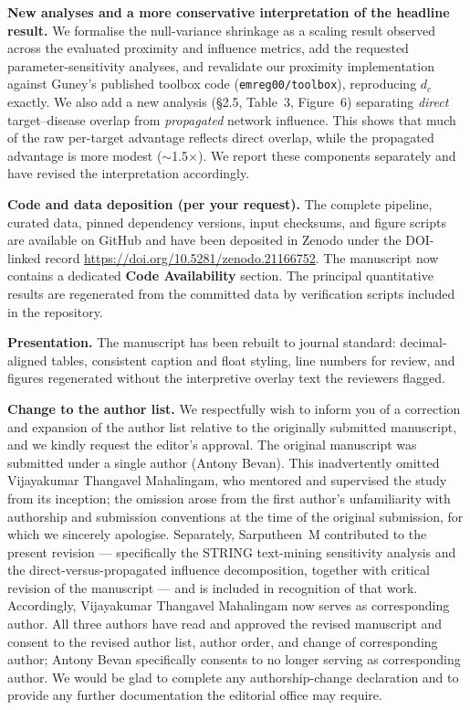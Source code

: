 \documentclass[11pt]{article}
\begin{document}
\bigskip
\noindent \textbf{New analyses and a more conservative interpretation of the headline result.}
We formalise the null-variance shrinkage as a scaling result observed across the evaluated proximity and influence metrics, add the requested parameter-sensitivity analyses, and revalidate our proximity implementation against Guney's published toolbox code (\texttt{emreg00/\allowbreak toolbox}), reproducing $d_c$ exactly. We also add a new analysis (\S2.5, Table~3, Figure~6) separating \emph{direct} target--disease overlap from \emph{propagated} network influence. This shows that much of the raw per-target advantage reflects direct overlap, while the propagated advantage is more modest ($\sim$1.5$\times$). We report these components separately and have revised the interpretation accordingly.

\bigskip
\noindent \textbf{Code and data deposition (per your request).}
The complete pipeline, curated data, pinned dependency versions, input checksums, and figure scripts are available on GitHub and have been deposited in Zenodo under the DOI-linked record \url{https://doi.org/10.5281/zenodo.21166752}. The manuscript now contains a dedicated \textbf{Code Availability} section. The principal quantitative results are regenerated from the committed data by verification scripts included in the repository.

\bigskip
\noindent \textbf{Presentation.}
The manuscript has been rebuilt to journal standard: decimal-aligned tables, consistent caption and float styling, line numbers for review, and figures regenerated without the interpretive overlay text the reviewers flagged.

\bigskip
\noindent \textbf{Change to the author list.}
We respectfully wish to inform you of a correction and expansion of the author list relative to the originally submitted manuscript, and we kindly request the editor's approval. The original manuscript was submitted under a single author (Antony Bevan). This inadvertently omitted Vijayakumar Thangavel Mahalingam, who mentored and supervised the study from its inception; the omission arose from the first author's unfamiliarity with authorship and submission conventions at the time of the original submission, for which we sincerely apologise. Separately, Sarputheen~M contributed to the present revision --- specifically the STRING text-mining sensitivity analysis and the direct-versus-propagated influence decomposition, together with critical revision of the manuscript --- and is included in recognition of that work. Accordingly, Vijayakumar Thangavel Mahalingam now serves as corresponding author. All three authors have read and approved the revised manuscript and consent to the revised author list, author order, and change of corresponding author; Antony Bevan specifically consents to no longer serving as corresponding author. We would be glad to complete any authorship-change declaration and to provide any further documentation the editorial office may require.
\end{document}
